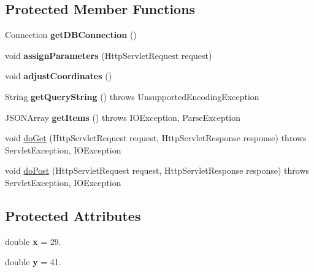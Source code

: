 \subsection*{Protected Member Functions}
\begin{DoxyCompactItemize}
\item 
\hypertarget{class_kagan_servlet_ae9cf99b19633877773e6f8346ed44948}{}Connection {\bfseries get\+D\+B\+Connection} ()\label{class_kagan_servlet_ae9cf99b19633877773e6f8346ed44948}

\item 
\hypertarget{class_kagan_servlet_a92634e1d189fec896f1b17e76d9f7043}{}void {\bfseries assign\+Parameters} (Http\+Servlet\+Request request)\label{class_kagan_servlet_a92634e1d189fec896f1b17e76d9f7043}

\item 
\hypertarget{class_kagan_servlet_a051d2f1b8de4f546c7503d422c3d4b13}{}void {\bfseries adjust\+Coordinates} ()\label{class_kagan_servlet_a051d2f1b8de4f546c7503d422c3d4b13}

\item 
\hypertarget{class_kagan_servlet_acb53e6d12a99ea9fe204400e279f5e4e}{}String {\bfseries get\+Query\+String} ()  throws Unsupported\+Encoding\+Exception \label{class_kagan_servlet_acb53e6d12a99ea9fe204400e279f5e4e}

\item 
\hypertarget{class_kagan_servlet_aa741ef72c6695ada00629566c9b5d5cd}{}J\+S\+O\+N\+Array {\bfseries get\+Items} ()  throws I\+O\+Exception, Parse\+Exception \label{class_kagan_servlet_aa741ef72c6695ada00629566c9b5d5cd}

\item 
void \hyperlink{class_kagan_servlet_a069884122c17967444f59c24436e0713}{do\+Get} (Http\+Servlet\+Request request, Http\+Servlet\+Response response)  throws Servlet\+Exception, I\+O\+Exception 
\item 
void \hyperlink{class_kagan_servlet_a557149953b3b57dc5a405506e8349609}{do\+Post} (Http\+Servlet\+Request request, Http\+Servlet\+Response response)  throws Servlet\+Exception, I\+O\+Exception 
\end{DoxyCompactItemize}
\subsection*{Protected Attributes}
\begin{DoxyCompactItemize}
\item 
\hypertarget{class_kagan_servlet_a11ae9a255dddeefefc0d95b38348f93b}{}double {\bfseries x} = 29.\label{class_kagan_servlet_a11ae9a255dddeefefc0d95b38348f93b}

\item 
\hypertarget{class_kagan_servlet_aaa8107ea89e2018b809bf569724c99db}{}double {\bfseries y} = 41.\label{class_kagan_servlet_aaa8107ea89e2018b809bf569724c99db}

\end{DoxyCompactItemize}


